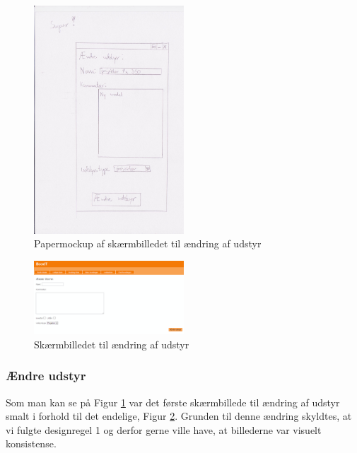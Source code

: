 \begin{figure}[h!]
  \centering
    \includegraphics[width=0.5\textwidth]{Appendix/GUI-Prototype/PaperMockup/AendreUdstyr_001}
  \caption{Papermockup af skærmbilledet til ændring af udstyr}
\label{Design_G_Development_EquipmentChange}
\end{figure} 

\begin{figure}[h!]
  \centering
    \includegraphics[width=0.5\textwidth]{Appendix/GUI-Prototype/DigitalMockup/AendreUdstyr}
  \caption{Skærmbilledet til ændring af udstyr}
\label{Design_G_Development_EquipmentChange_Final}
\end{figure} 

\subsubsection{Ændre udstyr}
Som man kan se på Figur \ref{Design_G_Development_EquipmentChange} var det første skærmbillede til ændring af udstyr smalt i forhold til det endelige, Figur \ref{Design_G_Development_EquipmentChange_Final}. Grunden til denne ændring skyldtes, at vi fulgte designregel 1 og derfor gerne ville have, at billederne var visuelt konsistense. 

